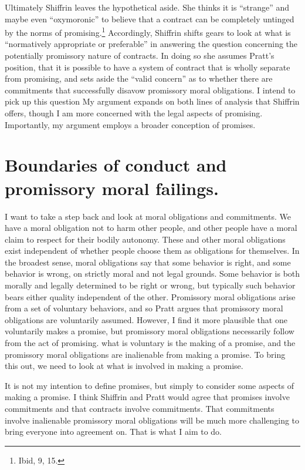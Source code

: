 Ultimately Shiffrin leaves the hypothetical aside. She thinks it is
``strange'' and maybe even ``oxymoronic'' to believe that a contract can
be completely untinged by the norms of promising.\footnote{Ibid, 9, 15.}
Accordingly, Shiffrin shifts gears to look at what is ``normatively
appropriate or preferable'' in answering the question concerning the
potentially promissory nature of contracts. In doing so she assumes
Pratt's position, that it is possible to have a system of contract that
is wholly separate from promising, and sets aside the ``valid concern''
as to whether there are commitments that successfully disavow promissory
moral obligations. I intend to pick up this question My argument expands
on both lines of analysis that Shiffrin offers, though I am more
concerned with the legal aspects of promising. Importantly, my argument
employs a broader conception of promises.

\section{Boundaries of conduct and promissory moral
failings.}

I want to take a step back and look at moral obligations and
commitments. We have a moral obligation not to harm other people, and
other people have a moral claim to respect for their bodily autonomy.
These and other moral obligations exist independent of whether people
choose them as obligations for themselves. In the broadest sense, moral
obligations say that some behavior is right, and some behavior is wrong,
on strictly moral and not legal grounds. Some behavior is both morally
and legally determined to be right or wrong, but typically such behavior
bears either quality independent of the other. Promissory moral
obligations arise from a set of voluntary behaviors, and so Pratt argues
that promissory moral obligations are voluntarily assumed. However, I
find it more plausible that one voluntarily makes a promise, but
promissory moral obligations necessarily follow from the act of
promising. what is voluntary is the making of a promise, and the
promissory moral obligations are inalienable from making a promise. To
bring this out, we need to look at what is involved in making a promise.

It is not my intention to define promises, but simply to consider some
aspects of making a promise. I think Shiffrin and Pratt would agree that
promises involve commitments and that contracts involve commitments.
That commitments involve inalienable promissory moral obligations will
be much more challenging to bring everyone into agreement on. That is
what I aim to do.

